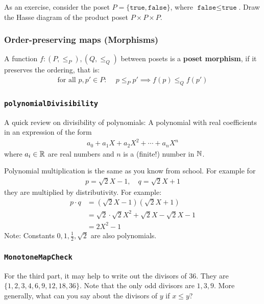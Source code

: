 As an exercise, consider the poset $P = \{\texttt{true},\texttt{false}\}$, where $\texttt{false}\leq \texttt{true}$.
Draw the Hasse diagram of the product poset $P \times P \times P$.


\subsubsection{Order-preserving maps (Morphisms)}
A function $f: (P, \leq_P), (Q,\leq_Q)$ between posets is a \textbf{poset morphism}, if it preserves the ordering, that is:
\begin{align*}
  \text{for all $p,p' \in P$: }
  \quad
  p \leq_P p' \implies f(p) \leq_Q f(p')
\end{align*}


\subsubsection{\texttt{polynomialDivisibility}}
A quick review on divisibility of polynomials:
A polynomial with real coefficients in an expression of the form
\begin{align*}
  a_0 + a_1 X + a_2 X^{2} + \cdots + a_n X^{n}
\end{align*}
where $a_i \in \mathbb{R}$ are real numbers and $n$ is a (finite!) number in $\mathbb{N}$.

Polynomial multiplication is the same as you know from school. For example for
\begin{align*}
  p = \sqrt{2}X - 1, \quad
  q = \sqrt{2}X + 1
\end{align*}
they are multiplied by distributivity. For example:
\begin{align*}
  p \cdot q 
  &= (\sqrt{2}X - 1) (\sqrt{2} X + 1) 
  \\
  &= 
  \sqrt{2} \cdot \sqrt{2} X^{2} + \sqrt{2}X - \sqrt{2}X - 1
  \\
  &= 2 X^{2} -1
\end{align*}
Note: Constants $0,1, \frac{1}{2}, \sqrt{2}$ are also polynomials.



\subsubsection{\texttt{MonotoneMapCheck}}
For the third part, it may help to write out the divisors of $36$. They are $\{1,2,3,4,6,9,12,18,36\}$. Note that the only odd divisors are $1,3,9$.
More generally, what can you say about the divisors of $y$ if $x \leq y$?

